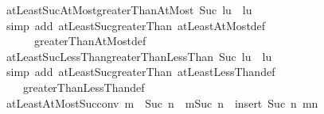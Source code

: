 \begin{isabellebody}
\endisatagproof
{\isafoldproof}%
%
\isadelimproof
\isanewline
%
\endisadelimproof
\isanewline
{}\isamarkupfalse%
\ atLeastSucAtMost{\isacharunderscore}{\kern0pt}greaterThanAtMost{\isacharcolon}{\kern0pt}\ {\isachardoublequoteopen}{\isacharbraceleft}{\kern0pt}Suc\ l{\isachardot}{\kern0pt}{\isachardot}{\kern0pt}u{\isacharbraceright}{\kern0pt}\ {\isacharequal}{\kern0pt}\ {\isacharbraceleft}{\kern0pt}l{\isacharless}{\kern0pt}{\isachardot}{\kern0pt}{\isachardot}{\kern0pt}u{\isacharbraceright}{\kern0pt}{\isachardoublequoteclose}\isanewline
%
\isadelimproof
\ \ %
\endisadelimproof
%
\isatagproof
{}\isamarkupfalse%
\ {\isacharparenleft}{\kern0pt}simp\ add{\isacharcolon}{\kern0pt}\ atLeast{\isacharunderscore}{\kern0pt}Suc{\isacharunderscore}{\kern0pt}greaterThan\ atLeastAtMost{\isacharunderscore}{\kern0pt}def\isanewline
\ \ \ \ \ \ greaterThanAtMost{\isacharunderscore}{\kern0pt}def{\isacharparenright}{\kern0pt}%
\endisatagproof
{\isafoldproof}%
%
\isadelimproof
\isanewline
%
\endisadelimproof
\isanewline
{}\isamarkupfalse%
\ atLeastSucLessThan{\isacharunderscore}{\kern0pt}greaterThanLessThan{\isacharcolon}{\kern0pt}\ {\isachardoublequoteopen}{\isacharbraceleft}{\kern0pt}Suc\ l{\isachardot}{\kern0pt}{\isachardot}{\kern0pt}{\isacharless}{\kern0pt}u{\isacharbraceright}{\kern0pt}\ {\isacharequal}{\kern0pt}\ {\isacharbraceleft}{\kern0pt}l{\isacharless}{\kern0pt}{\isachardot}{\kern0pt}{\isachardot}{\kern0pt}{\isacharless}{\kern0pt}u{\isacharbraceright}{\kern0pt}{\isachardoublequoteclose}\isanewline
%
\isadelimproof
\ \ %
\endisadelimproof
%
\isatagproof
{}\isamarkupfalse%
\ {\isacharparenleft}{\kern0pt}simp\ add{\isacharcolon}{\kern0pt}\ atLeast{\isacharunderscore}{\kern0pt}Suc{\isacharunderscore}{\kern0pt}greaterThan\ atLeastLessThan{\isacharunderscore}{\kern0pt}def\isanewline
\ \ \ \ greaterThanLessThan{\isacharunderscore}{\kern0pt}def{\isacharparenright}{\kern0pt}%
\endisatagproof
{\isafoldproof}%
%
\isadelimproof
\isanewline
%
\endisadelimproof
\isanewline
{}\isamarkupfalse%
\ atLeastAtMostSuc{\isacharunderscore}{\kern0pt}conv{\isacharcolon}{\kern0pt}\ {\isachardoublequoteopen}m\ {\isasymle}\ Suc\ n\ {\isasymLongrightarrow}\ {\isacharbraceleft}{\kern0pt}m{\isachardot}{\kern0pt}{\isachardot}{\kern0pt}Suc\ n{\isacharbraceright}{\kern0pt}\ {\isacharequal}{\kern0pt}\ insert\ {\isacharparenleft}{\kern0pt}Suc\ n{\isacharparenright}{\kern0pt}\ {\isacharbraceleft}{\kern0pt}m{\isachardot}{\kern0pt}{\isachardot}{\kern0pt}n{\isacharbraceright}{\kern0pt}{\isachardoublequoteclose}\isanewline
%
\isadelimproof

\end{isabellebody}
